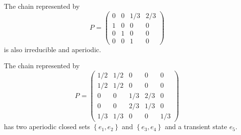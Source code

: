 \documentclass{beamer}
\providecommand{\cbrak}[1]{\ensuremath{\left\{#1\right\}}}
\begin{document}
\begin{frame}
The chain represented by 
\[
  P_{} = 
  \begin{pmatrix}
    0 & 0 & 1/3 & 2/3\\
    1 & 0 & 0 & 0 \\
    0 & 1 & 0 & 0\\
    0 & 0 & 1 & 0
  \end{pmatrix}
\] is also irreducible and aperiodic.
\end{frame}

\begin{frame}
The chain represented by
\[
  P_{} = 
  \begin{pmatrix}
    1/2 & 1/2 & 0 & 0 & 0\\
    1/2 & 1/2 & 0 & 0 & 0\\
    0 & 0 & 1/3 & 2/3 & 0\\
    0 & 0 & 2/3 & 1/3 & 0\\
    1/3 & 1/3 & 0 & 0 & 1/3
  \end{pmatrix}
\]
has two aperiodic closed sets \cbrak{e_1,e_2} and \cbrak{e_3,e_4} and a transient state $e_5$.
\end{frame}
\end{document}

